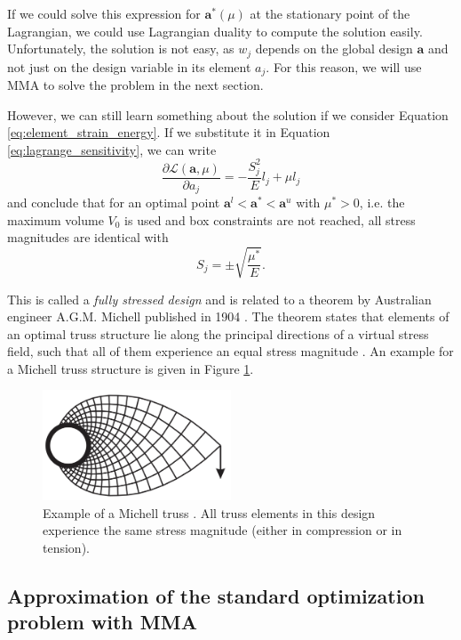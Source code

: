 If we could solve this expression for $\mathbf{a}^*(\mu)$ at the stationary point of the Lagrangian, we could use Lagrangian duality to compute the solution easily. Unfortunately, the solution is not easy, as $w_j$ depends on the global design $\mathbf{a}$ and not just on the design variable in its element $a_j$. For this reason, we will use MMA to solve the problem in the next section.

However, we can still learn something about the solution if we consider Equation \eqref{eq:element_strain_energy}. If we substitute it in Equation \eqref{eq:lagrange_sensitivity}, we can write 
\begin{equation}
    \frac{\partial \mathcal{L} (\mathbf{a}, \mu)}{\partial a_j} = - \frac{S^2_j}{E} l_j + \mu l_j
\end{equation}
and conclude that for an optimal point $\mathbf{a}^l < \mathbf{a}^* < \mathbf{a}^u$ with $\mu^*>0$, i.e. the maximum volume $V_0$ is used and box constraints are not reached, all stress magnitudes are identical with
\begin{equation}
    S_j = \pm \sqrt{\frac{\mu^*}{E}}.
\end{equation}

This is called a \emph{fully stressed design} and is related to a theorem by Australian engineer A.G.M. Michell published in 1904 \cite{Michell1904}. The theorem states that elements of an optimal truss structure lie along the principal directions of a virtual stress field, such that all of them experience an equal stress magnitude \cite{Arora2019}.
An example for a Michell truss structure is given in Figure \ref{fig:michell}.

\begin{figure}[!htpb]
    \centering
    \includegraphics[width=0.5\textwidth]{figures/michell.png}
    \caption{Example of a Michell truss \cite{Picelli2015}. All truss elements in this design experience the same stress magnitude (either in compression or in tension).}
    \label{fig:michell}
\end{figure}

\subsection{Approximation of the standard optimization problem with MMA}
\label{sec:sizing:mma}

